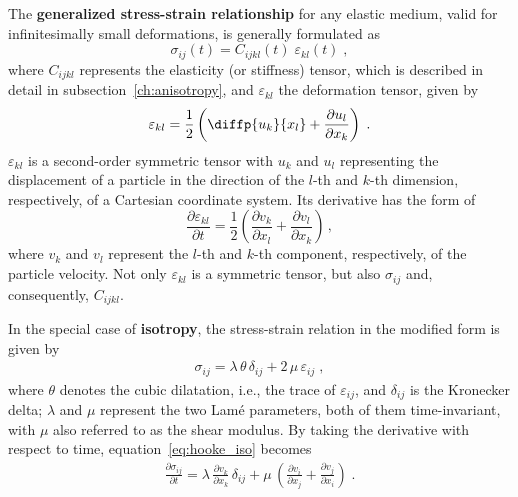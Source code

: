 The \textbf{generalized stress-strain relationship} for any elastic medium, valid for infinitesimally small deformations, is generally formulated as
\begin{equation}
    \sigma_{ij}(t) = C_{ijkl}(t)\;\varepsilon_{kl}(t)\;,
    \label{eq:stress_strain}
\end{equation}
where $C_{ijkl}$ represents the elasticity (or stiffness) tensor, which is described in detail in subsection~\ref{ch:anisotropy}, and $\varepsilon_{kl}$ the deformation tensor, given by
\begin{equation}
    \varepsilon_{kl} = \frac{1}{2} \left(\diffp{u_k}{x_l} + \frac{\partial u_l}{\partial x_k} \right)\;. 
    \label{eq:strain}
\end{equation}
$\varepsilon_{kl}$ is a second-order symmetric tensor with $u_k$ and $u_l$ representing the displacement of a particle in the direction of the $l$-th and $k$-th dimension, respectively, of a Cartesian coordinate system. Its derivative has the form of
\begin{equation}
    \frac{\partial \varepsilon_{kl}}{\partial t} = \frac{1}{2} \left(\frac{\partial v_k}{\partial x_l} + \frac{\partial v_l}{\partial x_k} \right)\,,
    \label{eq:strain_deriv}
\end{equation}
where $v_k$ and $v_l$ represent the $l$-th and $k$-th component, respectively, of the particle velocity. Not only $\varepsilon_{kl}$ is a symmetric tensor, but also $\sigma_{ij}$ and, consequently, $C_{ijkl}$.

In the special case of \textbf{isotropy}, the stress-strain relation in the modified form is given by
\begin{align}
    \sigma_{ij} = \lambda\,\theta\,\delta_{ij} + 2\,\mu\,\varepsilon_{ij}\;,
    \label{eq:hooke_iso}
\end{align}
where $\theta$ denotes the cubic dilatation, i.e., the trace of $\varepsilon_{ij}$, and $\delta_{ij}$ is the Kronecker delta; $\lambda$ and $\mu$ represent the two Lam\'e parameters, both of them time-invariant, with $\mu$ also referred to as the shear modulus. By taking the derivative with respect to time, equation~\ref{eq:hooke_iso} becomes
\begin{align}
    \frac{\partial \sigma_{ij}}{\partial t} = \lambda\,\frac{\partial v_k}{\partial x_k}\,\delta_{ij} + \mu\,\left(\frac{\partial v_i}{\partial x_j}+\frac{\partial v_j}{\partial x_i}\right)\;.
    \label{eq:hooke_iso_dot}
\end{align}

